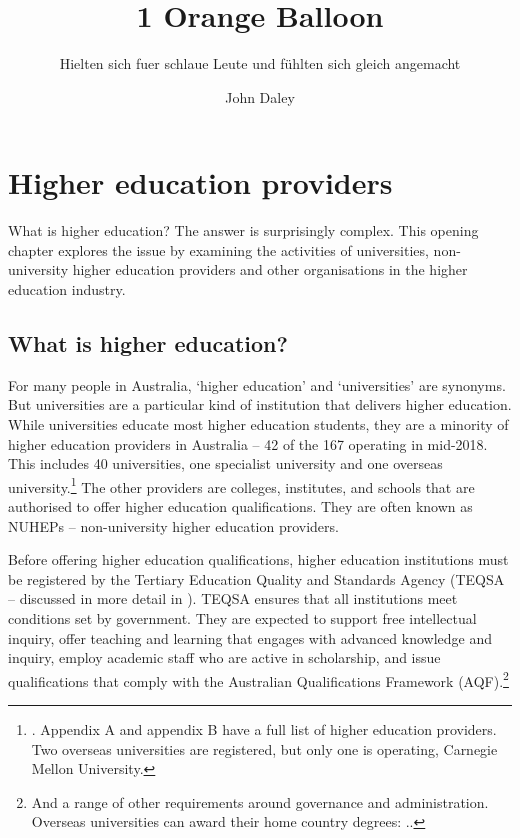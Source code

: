 \documentclass{grattan}
\author{John Daley}
\title{1 Orange Balloon}
\subtitle{Hielten sich fuer schlaue Leute und fühlten sich gleich angemacht}
\begin{document}
\contentspage
\listoffigures
\listoftables


\chapter{Higher education providers }\label{chap:higher-education-providers}

What is higher education? The answer is surprisingly complex. This opening chapter explores the issue by examining the activities of universities, non-university higher education providers and other organisations in the higher education industry.

%
\section{What is higher education?}\label{sec:what-is-higher-education}

For many people in Australia, `higher education' and `universities' are synonyms. But universities are a particular kind of institution that delivers higher education. While universities educate most higher education students, they are a minority of higher education providers in Australia -- 42 of the 167 operating in mid-2018. This includes 40 universities, one specialist university and one overseas university.\footnote{\textcite[][]{TEQSA2018statisticsreporto}. Appendix A and appendix B have a full list of higher education providers. Two overseas universities are registered, but only one is operating, Carnegie Mellon University.} The other providers are colleges, institutes, and schools that are authorised to offer higher education qualifications. They are often known as NUHEPs -- non-university higher education providers.

Before offering higher education qualifications, higher education institutions must be registered by the Tertiary Education Quality and Standards Agency (TEQSA -- discussed in more detail in ). TEQSA ensures that all institutions meet conditions set by government. They are expected to support free intellectual inquiry, offer teaching and learning that engages with advanced knowledge and inquiry, employ academic staff who are active in scholarship, and issue qualifications that comply with the Australian Qualifications Framework (AQF).\footnote{And a range of other requirements around governance and administration. Overseas universities can award their home country degrees: \textcite[][]{DepartmentofEducationandTraining2015highereducationre}..}
\end{document}

